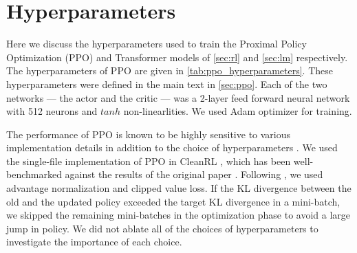 
\section{Hyperparameters}\label{app:hyperparameters}

Here we discuss the hyperparameters used to train the Proximal Policy Optimization (PPO) and Transformer models of \autoref{sec:rl} and \autoref{sec:lm} respectively.
The hyperparameters of PPO are given in \autoref{tab:ppo_hyperparameters}. These hyperparameters were defined in the main text in \autoref{sec:ppo}. Each of the two networks --- the actor and the critic --- was a 2-layer feed forward neural network with 512 neurons and $tanh$ non-linearlities. We used Adam optimizer for training.


The performance of PPO is known to be highly sensitive to various implementation details in addition to the choice of hyperparameters \cite{shengyi2022the37implementation, engstrom2020implementation}. We used the single-file implementation of PPO in CleanRL \cite{huang2022cleanrl}, which has been well-benchmarked against the results of the original paper \cite{schulman2017proximal}. Following  \cite{engstrom2020implementation}, we used advantage normalization and clipped value loss. If the KL divergence between the old and the updated policy exceeded the target KL divergence in a mini-batch, we skipped the remaining mini-batches in the optimization phase to avoid a large jump in policy.
We did not ablate all of the choices of hyperparameters to investigate the importance of each choice.

